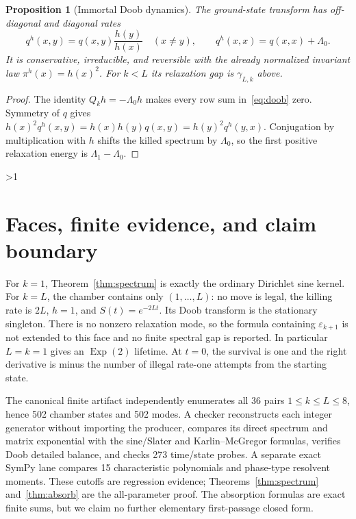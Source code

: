 \documentclass[10pt]{article}
\providecommand{\CRevisionRound}{2}
\newtheorem{proposition}{Proposition}
\newcommand{\1}{\mathbf 1}
\newcommand{\e}{\varepsilon}
\begin{document}
\begin{proposition}[Immortal Doob dynamics]\label{prop:doob}
The ground-state transform has off-diagonal and diagonal rates
\begin{equation}\label{eq:doob}
 q^h(x,y)=q(x,y)\frac{h(y)}{h(x)}\quad(x\ne y),\qquad
 q^h(x,x)=q(x,x)+\Lambda_0.
\end{equation}
It is conservative, irreducible, and reversible with the already normalized
invariant law $\pi^h(x)=h(x)^2$.  For $k<L$ its relaxation gap is
$\gamma_{L,k}$ above.
\end{proposition}

\begin{proof}
The identity $Q_kh=-\Lambda_0h$ makes every row sum in~\eqref{eq:doob}
zero.  Symmetry of $q$ gives
$h(x)^2q^h(x,y)=h(x)h(y)q(x,y)=h(y)^2q^h(y,x)$.
Conjugation by multiplication with $h$ shifts the killed spectrum by
$\Lambda_0$, so the first positive relaxation energy is
$\Lambda_1-\Lambda_0$.
\end{proof}
\fi

\ifnum\CRevisionRound>1
\section{Faces, finite evidence, and claim boundary}
For $k=1$, Theorem~\ref{thm:spectrum} is exactly the ordinary Dirichlet sine
kernel.  For $k=L$, the chamber contains only $(1,\ldots,L)$: no move is
legal, the killing rate is $2L$, $h=1$, and
$S(t)=e^{-2Lt}$.  Its Doob transform is the stationary singleton.  There is
no nonzero relaxation mode, so the formula containing $\e_{k+1}$ is not
extended to this face and no finite spectral gap is reported.  In particular
$L=k=1$ gives an $\operatorname{Exp}(2)$ lifetime.  At $t=0$, the survival is
one and the right derivative is minus the number of illegal rate-one
attempts from the starting state.

The canonical finite artifact independently enumerates all 36 pairs
$1\leq k\leq L\leq8$, hence 502 chamber states and 502 modes.  A checker
reconstructs each integer generator without importing the producer, compares
its direct spectrum and matrix exponential with the sine/Slater and
Karlin--McGregor formulas, verifies Doob detailed balance, and checks 273
time/state probes.  A separate exact SymPy lane compares 15 characteristic
polynomials and phase-type resolvent moments.  These cutoffs are regression
evidence; Theorems~\ref{thm:spectrum} and~\ref{thm:absorb} are the
all-parameter proof.  The absorption formulas are exact finite sums, but we
claim no further elementary first-passage closed form.
\end{document}
